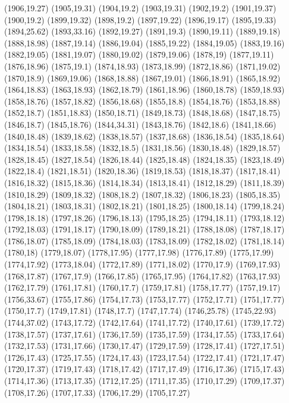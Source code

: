 (1906,19.27)
(1905,19.31)
(1904,19.2)
(1903,19.31)
(1902,19.2)
(1901,19.37)
(1900,19.2)
(1899,19.32)
(1898,19.2)
(1897,19.22)
(1896,19.17)
(1895,19.33)
(1894,25.62)
(1893,33.16)
(1892,19.27)
(1891,19.3)
(1890,19.11)
(1889,19.18)
(1888,18.98)
(1887,19.14)
(1886,19.04)
(1885,19.22)
(1884,19.05)
(1883,19.16)
(1882,19.05)
(1881,19.07)
(1880,19.02)
(1879,19.06)
(1878,19)
(1877,19.11)
(1876,18.96)
(1875,19.1)
(1874,18.93)
(1873,18.99)
(1872,18.86)
(1871,19.02)
(1870,18.9)
(1869,19.06)
(1868,18.88)
(1867,19.01)
(1866,18.91)
(1865,18.92)
(1864,18.83)
(1863,18.93)
(1862,18.79)
(1861,18.96)
(1860,18.78)
(1859,18.93)
(1858,18.76)
(1857,18.82)
(1856,18.68)
(1855,18.8)
(1854,18.76)
(1853,18.88)
(1852,18.7)
(1851,18.83)
(1850,18.71)
(1849,18.73)
(1848,18.68)
(1847,18.75)
(1846,18.7)
(1845,18.76)
(1844,34.31)
(1843,18.76)
(1842,18.6)
(1841,18.66)
(1840,18.48)
(1839,18.62)
(1838,18.57)
(1837,18.68)
(1836,18.54)
(1835,18.64)
(1834,18.54)
(1833,18.58)
(1832,18.5)
(1831,18.56)
(1830,18.48)
(1829,18.57)
(1828,18.45)
(1827,18.54)
(1826,18.44)
(1825,18.48)
(1824,18.35)
(1823,18.49)
(1822,18.4)
(1821,18.51)
(1820,18.36)
(1819,18.53)
(1818,18.37)
(1817,18.41)
(1816,18.32)
(1815,18.36)
(1814,18.34)
(1813,18.41)
(1812,18.29)
(1811,18.39)
(1810,18.29)
(1809,18.32)
(1808,18.2)
(1807,18.32)
(1806,18.23)
(1805,18.35)
(1804,18.21)
(1803,18.31)
(1802,18.21)
(1801,18.25)
(1800,18.14)
(1799,18.24)
(1798,18.18)
(1797,18.26)
(1796,18.13)
(1795,18.25)
(1794,18.11)
(1793,18.12)
(1792,18.03)
(1791,18.17)
(1790,18.09)
(1789,18.21)
(1788,18.08)
(1787,18.17)
(1786,18.07)
(1785,18.09)
(1784,18.03)
(1783,18.09)
(1782,18.02)
(1781,18.14)
(1780,18)
(1779,18.07)
(1778,17.95)
(1777,17.98)
(1776,17.89)
(1775,17.99)
(1774,17.92)
(1773,18.04)
(1772,17.89)
(1771,18.02)
(1770,17.9)
(1769,17.93)
(1768,17.87)
(1767,17.9)
(1766,17.85)
(1765,17.95)
(1764,17.82)
(1763,17.93)
(1762,17.79)
(1761,17.81)
(1760,17.7)
(1759,17.81)
(1758,17.77)
(1757,19.17)
(1756,33.67)
(1755,17.86)
(1754,17.73)
(1753,17.77)
(1752,17.71)
(1751,17.77)
(1750,17.7)
(1749,17.81)
(1748,17.7)
(1747,17.74)
(1746,25.78)
(1745,22.93)
(1744,37.02)
(1743,17.72)
(1742,17.64)
(1741,17.72)
(1740,17.61)
(1739,17.72)
(1738,17.57)
(1737,17.61)
(1736,17.59)
(1735,17.59)
(1734,17.55)
(1733,17.64)
(1732,17.53)
(1731,17.66)
(1730,17.47)
(1729,17.59)
(1728,17.41)
(1727,17.51)
(1726,17.43)
(1725,17.55)
(1724,17.43)
(1723,17.54)
(1722,17.41)
(1721,17.47)
(1720,17.37)
(1719,17.43)
(1718,17.42)
(1717,17.49)
(1716,17.36)
(1715,17.43)
(1714,17.36)
(1713,17.35)
(1712,17.25)
(1711,17.35)
(1710,17.29)
(1709,17.37)
(1708,17.26)
(1707,17.33)
(1706,17.29)
(1705,17.27)
